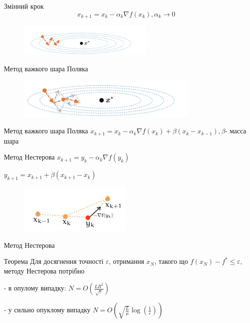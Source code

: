 \documentclass[a4paper, 14pt]{beamer}
\begin{document}
\begin{frame}{Змінний крок}
    $$x_{k+1} = x_k - \alpha_k \nabla f(x_k), \alpha_k \rightarrow 0$$
    \begin{figure}
        \includegraphics[width = 0.6\textwidth]{imgs/gradient.png}
    \end{figure}
\end{frame}

\begin{frame}{Метод важкого шара Поляка}
    \begin{figure}
        \includegraphics[width = 0.8\textwidth]{imgs/polyak.png}
    \end{figure}
\end{frame}

\begin{frame}{Метод важкого шара Поляка}
    $x_{k + 1} = x_k - \alpha_k \nabla f(x_k) + \beta (x_k - x_{k-1}), 
    \beta $- масса шара 
\end{frame}

\begin{frame}{Метод Нестерова}
    $x_{k + 1} = y_k - \alpha_k \nabla f(y_k) $ 


    $y_{k+1} = x_{k+1} + \beta (x_{k+1} - x_k)$
    \begin{figure}
        \includegraphics[width = 0.5\textwidth]{imgs/nesterov.png}
    \end{figure}
\end{frame}

\begin{frame}{Метод Нестерова}
    \begin{theo}{Теорема}
        Для досягнення точності $\varepsilon$, отримання 
        $x_N$, такого що $f\left(x_N\right)-f^* \leq \varepsilon$, 
        методу Нестерова потрібно
        
        
        - в опулому випадку: 
        $N=O\left(\frac{L R^2}{\sqrt{\varepsilon}}\right)$


        - у сильно опуклому випадку 
        $N=O\left(\sqrt{\frac{L}{\mu}} \log 
        \left(\frac{1}{\varepsilon}\right)\right)$ 
    \end{theo}
\end{frame}
\end{document}
